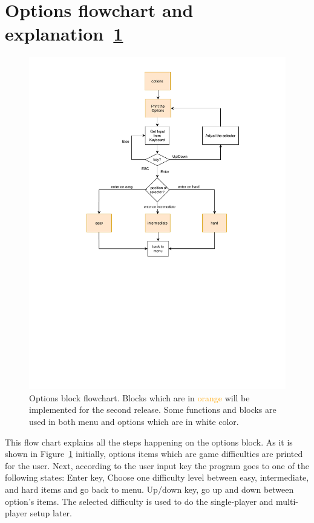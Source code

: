 \section{Options flowchart and explanation~\ref{fig:options}}
\begin{figure}
    \centering 
    \includegraphics[width=\columnwidth]{options.pdf}
    \caption{Options block flowchart. Blocks which are in \textcolor{orange}{orange} will be implemented for the second release. Some functions and blocks are used in both menu and options which are in white color.}
    \label{fig:options}
\end{figure}

This flow chart explains all the steps happening on the options block. 
As it is shown in Figure~\ref{fig:options} initially, options items which are game difficulties are printed for the user. 
Next, according to the user input key the program goes to one of the following states: 
Enter key, Choose one difficulty level between easy, intermediate, and hard items and go back to menu.
Up/down key, go up and down between option's items.
The selected difficulty is used to do the single-player and multi-player setup later.

